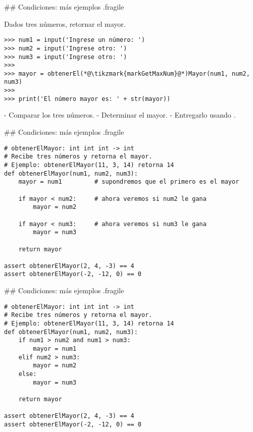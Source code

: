 \trmcolumns

## Condiciones: más ejemplos {.fragile}

\bgnblockgood
Dados \alert{tres} números, \alert{retornar} el mayor.
\trmblockgood

\begin{lstlisting}
>>> num1 = input('Ingrese un número: ')
>>> num2 = input('Ingrese otro: ')
>>> num3 = input('Ingrese otro: ')
>>> 
>>> mayor = obtenerEl(*@\tikzmark{markGetMaxNum}@*)Mayor(num1, num2, num3)
>>> 
>>> print('El número mayor es: ' + str(mayor))
\end{lstlisting}

\pause


\vspace{-1ex}
\bgncolumns


\footnotesize

- Comparar los tres números.
- Determinar el mayor.
- Entregarlo usando .

\trmcolumns

## Condiciones: más ejemplos {.fragile}


\begin{lstlisting}[style=frame02]
# obtenerElMayor: int int int -> int
# Recibe tres números y retorna el mayor.
# Ejemplo: obtenerElMayor(11, 3, 14) retorna 14
def obtenerElMayor(num1, num2, num3):
    mayor = num1         # supondremos que el primero es el mayor

    if mayor < num2:     # ahora veremos si num2 le gana
        mayor = num2

    if mayor < num3:     # ahora veremos si num3 le gana
        mayor = num3

    return mayor

assert obtenerElMayor(2, 4, -3) == 4
assert obtenerElMayor(-2, -12, 0) == 0
\end{lstlisting}

## Condiciones: más ejemplos {.fragile}


\begin{lstlisting}[style=frame02]
# obtenerElMayor: int int int -> int
# Recibe tres números y retorna el mayor.
# Ejemplo: obtenerElMayor(11, 3, 14) retorna 14
def obtenerElMayor(num1, num2, num3):
    if num1 > num2 and num1 > num3:
        mayor = num1
    elif num2 > num3:
        mayor = num2
    else:
        mayor = num3

    return mayor

assert obtenerElMayor(2, 4, -3) == 4
assert obtenerElMayor(-2, -12, 0) == 0
\end{lstlisting}


